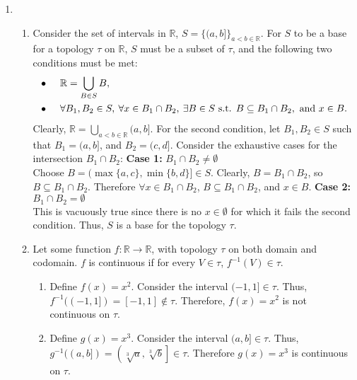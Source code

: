 \documentclass[a4paper,11pt]{article}
\newcommand{\ds}{\displaystyle}
\begin{document}
{{\begin{enumerate}[leftmargin=*]
\begin{enumerate}[label=\roman*)]
		\end{enumerate}
		\item
		\begin{enumerate}[label=\roman*)]
			\item Consider the set of intervals in $\ds{\mathbb{R}}$, $\ds{S = \{(a,b]\}_{a<b \in \mathbb{R}}}$. For $\ds{S}$ to be a base for a topology $\ds{\tau}$ on $\ds{\mathbb{R}}$, $\ds{S}$ must be a subset of $\ds{\tau}$, and the following two conditions must be met:
				\begin{align*}
					\bullet & \hspace{5mm} \mathbb{R} = \bigcup_{B\in S} B,\\
					\bullet & \hspace{5mm} \forall B_1,B_2 \in S, \: \forall x \in B_1 \cap B_2, \: \exists B \in S \text{ s.t. } B\subseteq B_1\cap B_2, \text{ and } x\in B.
				\end{align*}
				Clearly, $\ds{\mathbb{R} = \bigcup_{a<b\in \mathbb{R}}(a,b]}$. For the second condition, let $\ds{B_1,B_2 \in S}$ such that $\ds{B_1 = (a,b]}$, and $\ds{B_2 = (c,d]}$. Consider the exhaustive cases for the intersection $\ds{B_1 \cap B_2}$: 
				\bigbreak
				\textbf{Case 1:} $\ds{B_1 \cap B_2 \neq \emptyset}$ \\
				Choose $\ds{B = (\max\{a,c\},\min\{b,d\}] \in S}$. Clearly, $\ds{B = B_1 \cap B_2}$, so $\ds{B \subseteq B_1 \cap B_2}$. Therefore $\ds{\forall x \in B_1 \cap B_2}$, $\ds{B \subseteq B_1 \cap B_2}$, and $\ds{x \in B}$.
				\bigbreak
				\textbf{Case 2:} $\ds{B_1 \cap B_2 = \emptyset}$ \\
				This is vacuously true since there is no $\ds{x \in \emptyset}$ for which it fails the second condition.
				\bigbreak
			Thus, $\ds{S}$ is a base for the topology $\ds{\tau}$.
			\item  Let some function $\ds{f:\mathbb{R} \rightarrow \mathbb{R}}$, with topology $\ds{\tau}$ on both domain and codomain. $\ds{f}$ is continuous if for every $\ds{V \in \tau}$, $\ds{f^{-1}(V) \in \tau}$.
				\begin{enumerate}[label =\alph*)]
					\item Define $\ds{f(x) = x^2}$. Consider the interval $\ds{(-1, 1] \in \tau}$. Thus, $\ds{f^{-1}((-1,1]) = [-1,1] \notin \tau}$. Therefore, $\ds{f(x) = x^2}$ is not continuous on $\ds{\tau}$.
					\item Define $\ds{g(x) = x^3}$. Consider the interval $\ds{(a,b] \in \tau}$. Thus, $\ds{g^{-1}((a,b]) = \left(\sqrt[3]{a}, \sqrt[3]{b}\right] \in \tau}$. Therefore $\ds{g(x) = x^3}$ is continuous on $\ds{\tau}$.

\end{enumerate}
\end{enumerate}
\end{enumerate}}}
\end{document}

